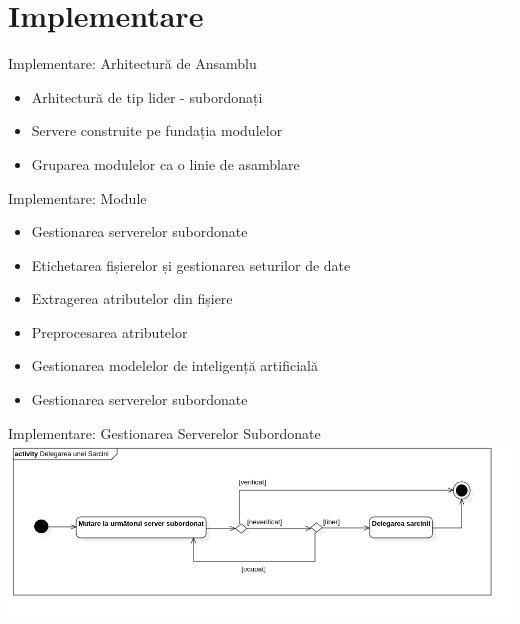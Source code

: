 \section{Implementare}

\begin{frame}{Implementare: Arhitectură de Ansamblu} \pause
	\begin{itemize}
		\item Arhitectură de tip lider - subordonați \pause
		\item Servere construite pe fundația modulelor \pause
		\item Gruparea modulelor ca o linie de asamblare
	\end{itemize}
\end{frame}

\begin{frame}{Implementare: Module} \pause
	\begin{itemize}
	    \item Gestionarea serverelor subordonate
	    \item Etichetarea fișierelor și gestionarea seturilor de date
		\item Extragerea atributelor din fișiere
		\item Preprocesarea atributelor
		\item Gestionarea modelelor de inteligență artificială
		\item Gestionarea serverelor subordonate
	\end{itemize}
\end{frame}

\begin{frame}{Implementare: Gestionarea Serverelor Subordonate}
	\includegraphics[width=\textwidth, center]{components/images/diagrams/activity_diagram_task_delegation.png}
    \captionsetup{justification=centering,margin=1cm}
\end{frame}

